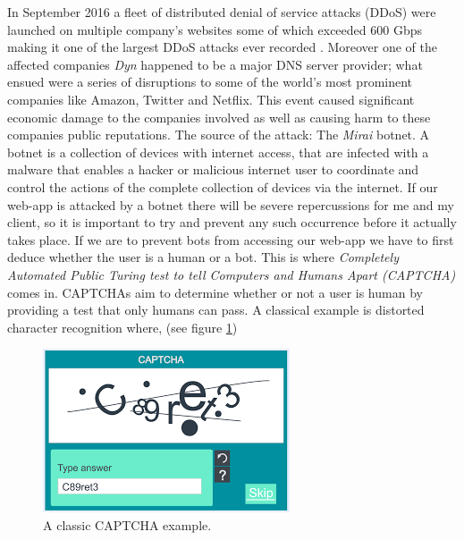In September 2016 a fleet of distributed denial of service
attacks (DDoS) were launched on multiple company's websites
some of which exceeded 600 Gbps making it one of the largest
DDoS attacks ever recorded \cite{mirai}. Moreover one of the
affected companies \textit{Dyn} happened to be a major DNS
server provider; what ensued were a series of disruptions to
some of the world's most prominent companies like Amazon,
Twitter and Netflix. This event caused significant economic
damage to the companies involved as well as causing harm to
these companies public reputations. The source of the attack:
The \textit{Mirai} botnet. A botnet is a collection of
devices with internet access, that are infected with a malware
that enables a hacker or malicious internet user to coordinate
and control the actions of the complete collection of devices
via the internet. If our web-app is attacked by a botnet
there will be severe repercussions for me and my client, so
it is important to try and prevent any such occurrence before
it actually takes place. If we are to prevent bots from
accessing our web-app we have to first deduce whether the user
is a human or a bot. This is where \textit{Completely
Automated Public Turing test to tell Computers and Humans
Apart (CAPTCHA)} comes in. CAPTCHAs aim to determine whether
or not a user is human by providing a test that only humans
can pass. A classical example is distorted character
recognition where, (see figure \ref{fig:captcha})
\\ \vspace{0.2cm}

\begin{figure}[h]
  \centering
  \includegraphics[scale=0.75]{Images/Captcha.png}
  \caption{A classic CAPTCHA example.}
  \label{fig:captcha}
\end{figure}

